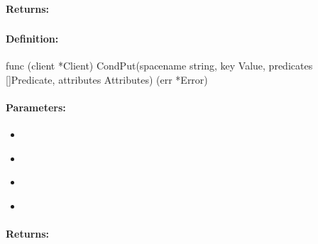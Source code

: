 \paragraph{Returns:}


\pagebreak
\subsubsection{}
\label{api:Go:CondPut}


\paragraph{Definition:}
\begin{gocode}
func (client *Client) CondPut(spacename string, key Value, predicates []Predicate, attributes Attributes) (err *Error)
\end{gocode}

\paragraph{Parameters:}
\begin{itemize}[noitemsep]
\item {}\\

\item {}\\

\item {}\\

\item {}\\

\end{itemize}

\paragraph{Returns:}


\pagebreak
\subsubsection{}
\label{api:Go:CondPutOrCreate}


